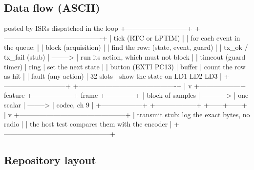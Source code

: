 \subsection*{Data flow (ASCII)}

\begin{asciiart}
             posted by ISRs                          dispatched in the loop
  +---------------------------+            +-------------------------------------------+
  | tick     (RTC or LPTIM)   |            | for each event in the queue:              |
  | block    (acquisition)    |            |   find the row: (state, event, guard)     |
  | tx_ok / tx_fail (stub)    |  --------> |   run its action, which must not block    |
  | timeout  (guard timer)    |  ring      |   set the next state                      |
  | button   (EXTI PC13)      |  buffer    |   count the row as hit                    |
  | fault    (any action)     |  32 slots  |   show the state on LD1 LD2 LD3           |
  +---------------------------+            +-------------------------------------------+
                                                     |
                                                     v
          +------------------+   feature    +------------------+   frame   +-------------+
          | block of samples | -----------> | one scalar       | --------> | codec, ch 9 |
          +------------------+              +------------------+           +------+------+
                                                                                  |
                                                                                  v
                                          +-----------------------------------------------+
                                          | transmit stub: log the exact bytes, no radio   |
                                          | the host test compares them with the encoder   |
                                          +-----------------------------------------------+
\end{asciiart}

\subsection*{Repository layout}

